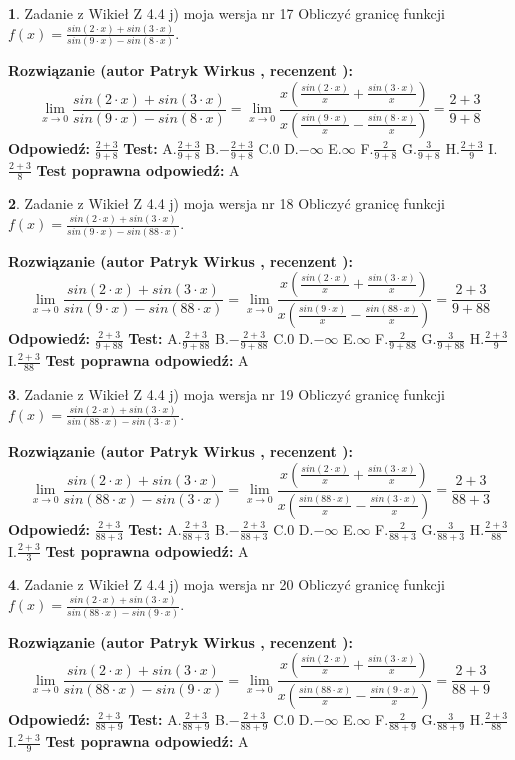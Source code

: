 \documentclass[12pt, a4paper]{article}
\theoremstyle{definition} %
\newtheorem{zad}{}
\newcommand{\zadStart}[1]{\begin{zad}#1\newline}
\newcommand{\zadStop}{\end{zad}}
\newcommand{\rozwStart}[2]{\noindent \textbf{Rozwiązanie (autor #1 , recenzent #2): }\newline}
\newcommand{\rozwStop}{\newline}
\newcommand{\odpStart}{\noindent \textbf{Odpowiedź:}\newline}
\newcommand{\odpStop}{\newline}
\newcommand{\testStart}{\noindent \textbf{Test:}\newline}
\newcommand{\testStop}{\newline}
\newcommand{\kluczStart}{\noindent \textbf{Test poprawna odpowiedź:}\newline}
\newcommand{\kluczStop}{\newline}
\begin{document}
\zadStart{Zadanie z Wikieł Z 4.4 j) moja wersja nr 17}
Obliczyć granicę funkcji $f(x)=\frac{sin(2\cdot x) +sin(3\cdot x)}{sin(9\cdot x) -sin(8\cdot x)}$.
\zadStop
\rozwStart{Patryk Wirkus}{}
$$\lim\limits_{x\to 0}\frac{sin(2\cdot x) +sin(3\cdot x)}{sin(9\cdot x) -sin(8\cdot x)}=\lim\limits_{x\to 0}\frac{x(\frac{sin(2\cdot x)}{x}+\frac{sin(3\cdot x)}{x})}{x(\frac{sin(9\cdot x)}{x}-\frac{sin(8\cdot x)}{x})}=\frac{2+3}{9+8}$$
\rozwStop
\odpStart
$\frac{2+3}{9+8}$
\odpStop
\testStart
A.$\frac{2+3}{9+8}$
B.$-\frac{2+3}{9+8}$
C.$0$
D.$-\infty$
E.$\infty$
F.$\frac{2}{9+8}$
G.$\frac{3}{9+8}$
H.$\frac{2+3}{9}$
I.$\frac{2+3}{8}$
\testStop
\kluczStart
A
\kluczStop



\zadStart{Zadanie z Wikieł Z 4.4 j) moja wersja nr 18}
Obliczyć granicę funkcji $f(x)=\frac{sin(2\cdot x) +sin(3\cdot x)}{sin(9\cdot x) -sin(88\cdot x)}$.
\zadStop
\rozwStart{Patryk Wirkus}{}
$$\lim\limits_{x\to 0}\frac{sin(2\cdot x) +sin(3\cdot x)}{sin(9\cdot x) -sin(88\cdot x)}=\lim\limits_{x\to 0}\frac{x(\frac{sin(2\cdot x)}{x}+\frac{sin(3\cdot x)}{x})}{x(\frac{sin(9\cdot x)}{x}-\frac{sin(88\cdot x)}{x})}=\frac{2+3}{9+88}$$
\rozwStop
\odpStart
$\frac{2+3}{9+88}$
\odpStop
\testStart
A.$\frac{2+3}{9+88}$
B.$-\frac{2+3}{9+88}$
C.$0$
D.$-\infty$
E.$\infty$
F.$\frac{2}{9+88}$
G.$\frac{3}{9+88}$
H.$\frac{2+3}{9}$
I.$\frac{2+3}{88}$
\testStop
\kluczStart
A
\kluczStop



\zadStart{Zadanie z Wikieł Z 4.4 j) moja wersja nr 19}
Obliczyć granicę funkcji $f(x)=\frac{sin(2\cdot x) +sin(3\cdot x)}{sin(88\cdot x) -sin(3\cdot x)}$.
\zadStop
\rozwStart{Patryk Wirkus}{}
$$\lim\limits_{x\to 0}\frac{sin(2\cdot x) +sin(3\cdot x)}{sin(88\cdot x) -sin(3\cdot x)}=\lim\limits_{x\to 0}\frac{x(\frac{sin(2\cdot x)}{x}+\frac{sin(3\cdot x)}{x})}{x(\frac{sin(88\cdot x)}{x}-\frac{sin(3\cdot x)}{x})}=\frac{2+3}{88+3}$$
\rozwStop
\odpStart
$\frac{2+3}{88+3}$
\odpStop
\testStart
A.$\frac{2+3}{88+3}$
B.$-\frac{2+3}{88+3}$
C.$0$
D.$-\infty$
E.$\infty$
F.$\frac{2}{88+3}$
G.$\frac{3}{88+3}$
H.$\frac{2+3}{88}$
I.$\frac{2+3}{3}$
\testStop
\kluczStart
A
\kluczStop



\zadStart{Zadanie z Wikieł Z 4.4 j) moja wersja nr 20}
Obliczyć granicę funkcji $f(x)=\frac{sin(2\cdot x) +sin(3\cdot x)}{sin(88\cdot x) -sin(9\cdot x)}$.
\zadStop
\rozwStart{Patryk Wirkus}{}
$$\lim\limits_{x\to 0}\frac{sin(2\cdot x) +sin(3\cdot x)}{sin(88\cdot x) -sin(9\cdot x)}=\lim\limits_{x\to 0}\frac{x(\frac{sin(2\cdot x)}{x}+\frac{sin(3\cdot x)}{x})}{x(\frac{sin(88\cdot x)}{x}-\frac{sin(9\cdot x)}{x})}=\frac{2+3}{88+9}$$
\rozwStop
\odpStart
$\frac{2+3}{88+9}$
\odpStop
\testStart
A.$\frac{2+3}{88+9}$
B.$-\frac{2+3}{88+9}$
C.$0$
D.$-\infty$
E.$\infty$
F.$\frac{2}{88+9}$
G.$\frac{3}{88+9}$
H.$\frac{2+3}{88}$
I.$\frac{2+3}{9}$
\testStop
\kluczStart
A
\kluczStop
\end{document}
